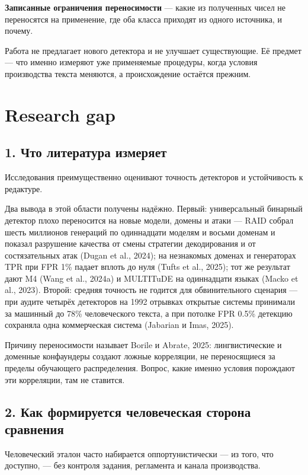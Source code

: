 \documentclass[11pt,a4paper]{article}
\renewcommand{\_}{\textunderscore\allowbreak}
\begin{document}
\textbf{Записанные ограничения переносимости} — какие из полученных чисел не переносятся
на применение, где оба класса приходят из одного источника, и почему.

Работа не предлагает нового детектора и не улучшает существующие. Её предмет —
что именно измеряют уже применяемые процедуры, когда условия производства текста
меняются, а происхождение остаётся прежним.

\section{Research gap}

\subsection{1. Что литература измеряет}

Исследования преимущественно оценивают точность детекторов и устойчивость к
редактуре.

Два вывода в этой области получены надёжно. Первый: универсальный бинарный
детектор плохо переносится на новые модели, домены и атаки — RAID собрал шесть
миллионов генераций по одиннадцати моделям и восьми доменам и показал разрушение
качества от смены стратегии декодирования и от состязательных атак (Dugan et al., 2024); на
незнакомых доменах и генераторах TPR при FPR 1\% падает вплоть до нуля (Tufts et al., 2025); тот
же результат дают M4 (Wang et al., 2024a) и MULTITuDE на одиннадцати языках (Macko et al., 2023). Второй:
средняя точность не годится для обвинительного сценария — при аудите четырёх
детекторов на 1992 отрывках открытые системы принимали за машинный до 78\%
человеческого текста, а при потолке FPR 0.5\% детекцию сохраняла одна коммерческая
система (Jabarian и Imas, 2025).

Причину переносимости называет Borile и Abrate, 2025: лингвистические и доменные конфаундеры
создают ложные корреляции, не переносящиеся за пределы обучающего распределения.
Вопрос, какие именно условия порождают эти корреляции, там не ставится.

\subsection{2. Как формируется человеческая сторона сравнения}

Человеческий эталон часто набирается оппортунистически — из того, что доступно, —
без контроля задания, регламента и канала производства.
\end{document}
